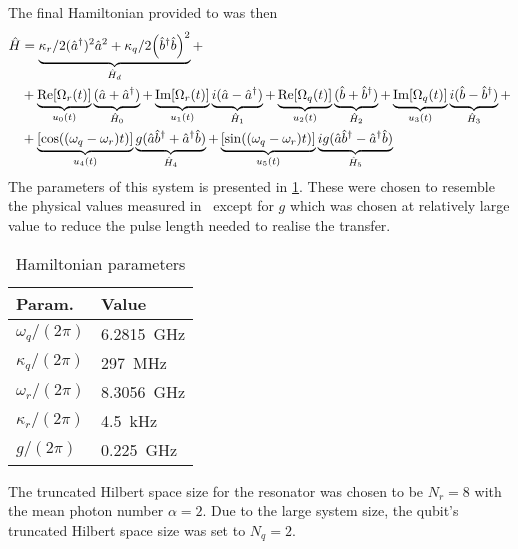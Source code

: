 \documentclass[main.tex]{subfiles}
\begin{document}
The final Hamiltonian provided to \krotov{} was then
\begin{equation}
    \begin{split}
        \hat{H} &= \underbrace{\kappa_r/2(\hat{a}^\dagger)^2\hat{a}^2 +\kappa_q/2\qty(\hat{b}^\dagger\hat{b})^2}_{\hat{H}_d} + \\
        &+\underbrace{\text{Re}\qty[\Omega_r(t)]}_{u_0(t)}\underbrace{(\hat{a} + \hat{a}^\dagger)}_{\hat{H}_0} + \underbrace{\text{Im}\qty[\Omega_r(t)]}_{u_1(t)}\underbrace{i(\hat{a} - \hat{a}^\dagger)}_{\hat{H}_1} + \underbrace{\text{Re}\qty[\Omega_q(t)]}_{u_2(t)}\underbrace{(\hat{b} + \hat{b}^\dagger)}_{\hat{H}_2} + \underbrace{\text{Im}\qty[\Omega_q(t)]}_{u_3(t)}\underbrace{i(\hat{b} - \hat{b}^\dagger)}_{\hat{H}_3} +\\
        &+\underbrace{\qty[\cos((\omega_q-\omega_r)t)]}_{u_4(t)}\underbrace{g(\hat{a}\hat{b}^\dagger + \hat{a}^\dagger\hat{b})}_{\hat{H}_4} + \underbrace{\qty[\sin((\omega_q-\omega_r)t)]}_{u_5(t)}\underbrace{ig(\hat{a}\hat{b}^\dagger - \hat{a}^\dagger\hat{b})}_{\hat{H}_5}
        \label{eq:cat-hamiltonian-rotating}
    \end{split}
\end{equation}
The parameters of this system is presented in \cref{tab:ham-params}.
These were chosen to resemble the physical values measured in~\cite{ofek_extending_2016} except for \(g\) which was chosen at relatively large value to reduce the pulse length needed to realise the transfer.
\begin{table}[H]
    \caption{Hamiltonian parameters}%
    \label{tab:ham-params}
    \centering
    \begin{tabular}{@{}ll@{}}
    \toprule
    Param. & Value\\ \midrule
    \(\omega_q/(2\pi)\) & \SI{6.2815}{\giga\hertz} \\
    \(\kappa_q/(2\pi)\) & \SI{297}{\mega\hertz} \\
    \(\omega_r/(2\pi)\) & \SI{8.3056}{\giga\hertz} \\
    \(\kappa_r/(2\pi)\) & \SI{4.5}{\kilo\hertz} \\
    \(g/(2\pi)\) & \SI{0.225}{\giga\hertz} \\
    \bottomrule
    \end{tabular}
\end{table}
The truncated Hilbert space size for the resonator was chosen to be \( N_r = 8 \) with the mean photon number \(\alpha = 2\).
Due to the large system size, the qubit's truncated Hilbert space size was set to \(N_q = 2\).
\end{document}
